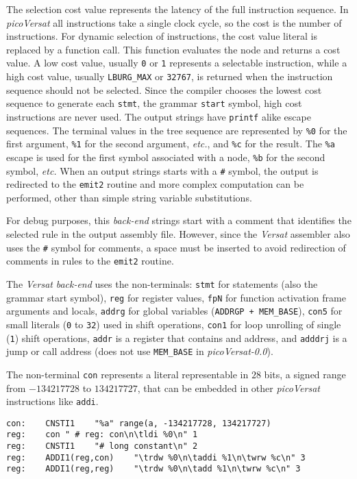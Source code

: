 The selection cost value represents the latency of the full
instruction sequence.
In {\it picoVersat} all instructions take a single clock cycle,
so the cost is the number of instructions.
For dynamic selection of instructions, the cost value literal
is replaced by a function call. This function evaluates the
node and returns a cost value.
A low cost value, usually {\tt 0} or {\tt 1} represents a
selectable instruction, while a high cost value, usually
{\tt LBURG\_MAX} or {\tt 32767}, is returned when the
instruction sequence should not be selected.
Since the compiler chooses the lowest cost sequence to
generate each {\tt stmt}, the grammar {\tt start} symbol,
high cost instructions are never used.
The output strings have {\tt printf} alike escape sequences.
The terminal values in the tree sequence are represented
by {\tt \%0} for the first argument, {\tt \%1} for the
second argument, {\it etc.}, and {\tt \%c} for the result.
The {\tt \%a} escape is used for the first symbol associated
with a node, {\tt \%b} for the second symbol, {\it etc.}
When an output strings starts with a {\tt \#} symbol, the
output is redirected to the {\tt emit2} routine and more
complex computation can be performed, other than simple
string variable substitutions.

For debug purposes, this {\it back-end} strings start with a
comment that identifies the selected rule in the output
assembly file.
However, since the {\it Versat} assembler also uses the
{\tt \#} symbol for comments, a space must be inserted
to avoid redirection of comments in rules to the
{\tt emit2} routine.

The {\it Versat} {\it back-end} uses the non-terminals:
{\tt stmt} for statements (also the grammar start symbol),
{\tt reg} for register values, {\tt fpN} for function
activation frame arguments and locals, {\tt addrg}
for global variables ({\tt ADDRGP + MEM\_BASE}), {\tt con5}
for small literals ({\tt 0} to {\tt 32}) used in shift
operations,
{\tt con1} for loop unrolling of single ({\tt 1}) shift
operations, {\tt addr} is a register that contains and address,
and {\tt adddrj} is a jump or call address (does not use
{\tt MEM\_BASE} in {\it picoVersat-0.0}).

The non-terminal {\tt con} represents a literal
representable in $28$ bits,
a signed range from $-134217728$ to $134217727$,
that can be embedded in other
{\it picoVersat} instructions like {\tt addi}.
\begin{Verbatim}[baselinestretch=1.2]
con:    CNSTI1    "%a" range(a, -134217728, 134217727)
reg:    con	" # reg: con\n\tldi %0\n" 1
reg:    CNSTI1    "# long constant\n" 2
reg:    ADDI1(reg,con)    "\trdw %0\n\taddi %1\n\twrw %c\n" 3
reg:    ADDI1(reg,reg)    "\trdw %0\n\tadd %1\n\twrw %c\n" 3
\end{Verbatim}

